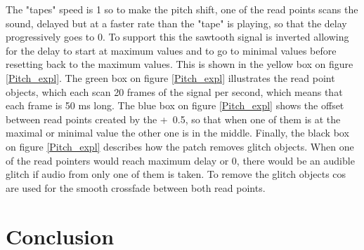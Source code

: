 The "tapes" speed is 1 so to make the pitch shift, one of the read points scans the sound, delayed but at a faster rate than the "tape" is playing, so that the delay progressively goes to 0. To support this the sawtooth signal is inverted allowing for the delay to start at maximum values and to go to minimal values before resetting back to the maximum values. This is shown in the yellow box on figure \ref{Pitch_expl}. The green box on figure \ref{Pitch_expl} illustrates the read point objects, which each scan 20 frames of the signal per second, which means that each frame is 50 ms long.
The blue box on figure \ref{Pitch_expl} shows the offset between read points created by the +~0.5, so that when one of them is at the maximal or minimal value the other one is in the middle.
Finally, the black box on figure \ref{Pitch_expl} describes how the patch removes glitch objects. When one of the read pointers would reach maximum delay or 0, there would be an audible glitch if audio from only one of them is taken. To remove the glitch objects cos~ are used for the smooth crossfade between both read points. 

\section{Conclusion}

